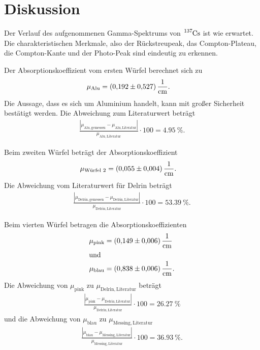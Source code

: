 \section{Diskussion}
\label{sec:Diskussion}

Der Verlauf des aufgenommenen Gamma-Spektrums von $\ce{^{137}Cs}$ ist wie erwartet.
Die charakteristischen Merkmale, also der Rückstreupeak, das Compton-Plateau, die Compton-Kante und der Photo-Peak sind eindeutig zu erkennen.

Der Absorptionskoeffizient vom ersten Würfel berechnet sich zu
\begin{align*}
    \mu_{\text{Alu}} &= \qty{0.192 \pm 0.527}{\per\centi\meter}.
\end{align*}
Die Aussage, dass es sich um Aluminium handelt, kann mit großer Sicherheit bestätigt werden.
Die Abweichung zum Literaturwert beträgt
\begin{align*}
   \frac{|\mu_\mathrm{Alu, gemessen}-\mu_\mathrm{Alu, Literatur}|}{\mu_\mathrm{Alu, Literatur}} \cdot 100 = \qty{4.95}{\percent}.
\end{align*}

Beim zweiten Würfel beträgt der Absorptionskoeffizient
\begin{align*}
    \mu_{\text{Würfel 2}} &= \qty{0.055 \pm 0.004}{\per\centi\meter}.
\end{align*}
Die Abweichung vom Literaturwert für Delrin beträgt
\begin{align*}
    \frac{|\mu_\mathrm{Delrin, gemessen}-\mu_\mathrm{Delrin, Literatur}|}{\mu_\mathrm{Delrin, Literatur}} \cdot 100 = \qty{53.39}{\percent}.
\end{align*}

Beim vierten Würfel betragen die Absorptionskoeffizienten
\begin{align*}
    \mu_{\mathrm{pink}} &= \qty{0.149 \pm 0.006}{\per\centi\meter} \\
    \shortintertext{und}
    \mu_{\mathrm{blau}} &= \qty{0.838 \pm 0.006}{\per\centi\meter}.
\end{align*}
Die Abweichung von $\mu_{\mathrm{pink}}$ zu $\mu_{\mathrm{Delrin, Literatur}}$ beträgt 
\begin{align*}
    \frac{|\mu_{\mathrm{pink}}-\mu_\mathrm{Delrin, Literatur}|}{\mu_\mathrm{Delrin, Literatur}} \cdot 100 = \qty{26.27}{\percent}
\end{align*}
und die Abweichung von $\mu_{\mathrm{blau}}$ zu $\mu_{\mathrm{Messing, Literatur}}$
\begin{align*}
    \frac{|\mu_{\mathrm{blau}}-\mu_\mathrm{Messing, Literatur}|}{\mu_\mathrm{Messing, Literatur}} \cdot 100 = \qty{36.93}{\percent}.
\end{align*}

